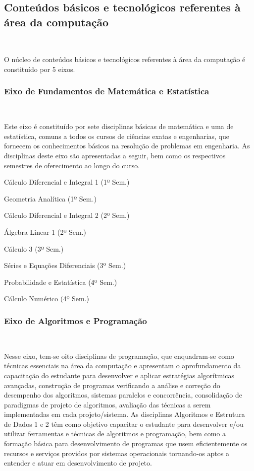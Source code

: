 \subsection{Conteúdos básicos e tecnológicos referentes à área da computação}~\label{sec:cb_tac}

O núcleo de conteúdos básicos e tecnológicos referentes à área da computação é constituído por 5 eixos.

\subsubsection{Eixo de Fundamentos de Matemática e Estatística}~\label{sec:E1}

Este eixo é constituído por sete disciplinas básicas de matemática e uma de estatística, comuns a todos os cursos de ciências exatas e engenharias, que fornecem os conhecimentos básicos na resolução de problemas em engenharia. As disciplinas deste eixo são apresentadas a seguir, bem como os respectivos semestres de oferecimento ao longo do curso.

\begin{compenum}
    \item Cálculo Diferencial e Integral 1 (1º Sem.)
    \item Geometria Analítica (1º Sem.)
    \item Cálculo Diferencial e Integral 2 (2º Sem.)
    \item Álgebra Linear 1 (2º Sem.)
    \item Cálculo 3 (3º Sem.)
    \item Séries e Equações Diferenciais (3º Sem.)
    \item Probabilidade e Estatística (4º Sem.)
    \item Cálculo Numérico (4º Sem.)
\end{compenum}

\subsubsection{Eixo de Algoritmos e Programação}~\label{sec:E4}

Nesse eixo, tem-se oito disciplinas de programação, que enquadram-se como técnicas essenciais na área da computação e apresentam o aprofundamento da capacitação do {estudante} para desenvolver e aplicar estratégias algorítmicas avançadas, construção de programas verificando a análise e correção do desempenho dos algoritmos, sistemas paralelos e concorrência, consolidação de paradigmas de projeto de algoritmos, avaliação das técnicas a serem implementadas em cada projeto/sistema.
As disciplinas Algoritmos e Estrutura de Dados 1 e 2 têm como objetivo capacitar o {estudante} para desenvolver e/ou utilizar ferramentas e técnicas de algoritmos e programação, bem como a formação básica para desenvolvimento de programas que usem eficientemente os recursos e serviços providos por sistemas operacionais tornando-os aptos a entender e atuar em desenvolvimento de projeto.

